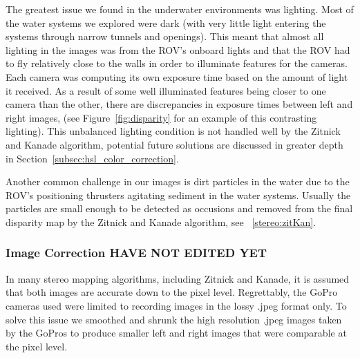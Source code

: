 \documentclass[twocolumn]{article}
\begin{document}
The greatest issue we found in the underwater environments was lighting.  Most of the water systems we explored were dark (with very little light entering the systems through narrow tunnels and openings).  This meant that almost all lighting in the images was from the ROV's onboard lights and that the ROV had to fly relatively close to the walls in order to illuminate features for the cameras.
Each camera was computing its own exposure time based on the amount of light it received.  
As a result of some well illuminated features being closer to one camera than the other, there are discrepancies in exposure times between left and right images, (see Figure~\ref{fig:disparity} for an example of this contrasting lighting).
  This unbalanced lighting condition is not handled well by the Zitnick and Kanade algorithm, potential future solutions are discussed in greater depth in Section~\ref{subsec:hsl_color_correction}.

Another common challenge in our images is dirt particles in the water due to the ROV's positioning thrusters agitating sediment in the water systems. Usually the particles are small enough to be detected as occusions and removed from the final disparity map by the Zitnick and Kanade algorithm, see ~\ref{stereo:zitKan}.

\subsubsection{Image Correction HAVE NOT EDITED YET}
\label{subsec:image_correction}

In many stereo mapping algorithms, including Zitnick and Kanade, it is assumed that both images are accurate down to the pixel level.
Regrettably, the GoPro cameras used were limited to recording images in the lossy .jpeg format only.
To solve this issue we smoothed and shrunk the high resolution .jpeg images taken by the GoPros to produce smaller left and right images that were comparable at the pixel level.
\end{document}
